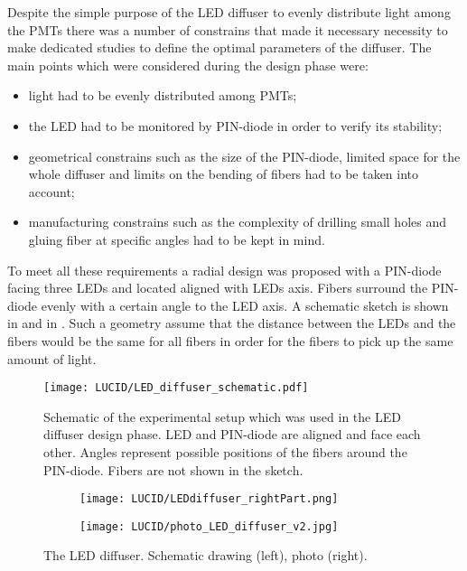 Despite the simple purpose of the LED diffuser to evenly distribute light among the PMTs 
there was a number of constrains that made it necessary necessity to make dedicated studies 
to define the optimal parameters of the diffuser. The main points which were considered during the design phase were:
\begin{itemize}
 \item light had to be evenly distributed among PMTs;
 \item the LED had to be monitored by PIN-diode in order to verify its stability;
 \item geometrical constrains such as the size of the PIN-diode, 
       limited space for the whole diffuser and limits on the bending of fibers had to be taken into account;
 \item manufacturing constrains such as the complexity of drilling small holes and gluing fiber at specific angles had to be kept in mind.
\end{itemize}

To meet all these requirements a radial design was proposed with a PIN-diode facing three LEDs and located aligned with LEDs axis. Fibers surround the PIN-diode 
evenly with a certain angle to the LED axis. A schematic sketch is shown in  and in .
Such a geometry assume that the distance between the LEDs and the fibers would be the same for all fibers in order for 
the fibers to pick up the same amount of light.
  
\begin{figure}
\centering
\texttt{[image: LUCID/LED\_diffuser\_schematic.pdf]}
\caption{Schematic of the experimental setup which was used in the LED diffuser design phase. LED and PIN-diode are aligned and face each other. 
	 Angles represent possible positions of the fibers around the PIN-diode. Fibers are not shown in the sketch.}
\label{fig:AngularMeasurementSetup}
\end{figure}

\begin{figure}
\begin{subfigure}{.48\textwidth}
  \centering
  \texttt{[image: LUCID/LEDdiffuser\_rightPart.png]}
\end{subfigure}
\begin{subfigure}{.48\textwidth}
  \centering
  \texttt{[image: LUCID/photo\_LED\_diffuser\_v2.jpg]}
\end{subfigure}

\caption{The LED diffuser. Schematic drawing (left), photo (right).}
\label{fig:LEDDiffuser}
\end{figure}
  
